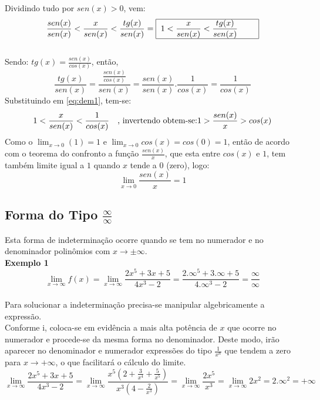 Dividindo tudo por $sen(x) > 0$, vem:\\
\begin{equation}
\label{eq:dem1}
\frac{sen(x)}{sen(x)} < \frac{x}{sen(x)} < \frac{tg(x)}{sen(x)} = \begin{tabular}{|p{4.0cm}|} \hline  $\displaystyle 1 < \frac{x}{sen(x)} < \frac{tg(x)}{sen(x)}$\\ \hline \end{tabular}
\end{equation}\\




Sendo: $\displaystyle tg(x) = \frac{sen(x)}{cos(x)}$, então, $$\displaystyle \frac{tg(x)}{sen(x)} = \frac{\frac{sen(x)}{cos(x)}}{sen(x)} = \frac{sen(x)}{sen(x)} . \frac{1}{cos(x)} = \frac{1}{cos(x)}$$ Substituindo em \ref{eq:dem1}, tem-se:
$$
1 < \frac{x}{sen(x)} < \frac{1}{cos(x)} \quad \textrm{, invertendo obtem-se:}\\
1 > \frac{sen(x)}{x} > cos(x)
$$
Como o $\displaystyle \lim_{x \to 0} (1) = 1$ e $\displaystyle \lim_{x \to 0} cos(x) = cos(0) = 1$, então de acordo com o teorema do confronto a função $\displaystyle \frac{sen(x)}{x}$, que esta entre $cos(x)$ e $1$, tem também limite igual a $1$ quando $x$ tende a $0$ (zero), logo:
$$
\lim_{x \to 0} \frac{sen(x)}{x} = 1
$$


\subsection{Forma do Tipo $\displaystyle \frac{\infty}{\infty}$}
Esta forma de indeterminação ocorre quando se tem no numerador e no denominador polinômios com $x \to \pm \infty$.\\


\textbf{Exemplo 1}$$\displaystyle \lim_{x \to \infty} f(x) = \lim_{x \to \infty} \frac{2x^5+3x+5}{4x^3 -2} = \frac{2 . \infty^5 + 3 . \infty + 5}{4 . \infty^3 -2} = \frac{\infty}{\infty}$$\\

Para solucionar a indeterminação precisa-se manipular algebricamente a expressão.\\

\quad Conforme i, coloca-se em evidência a mais alta potência de $x$ que ocorre no numerador e procede-se da mesma forma no denominador. Deste modo, irão aparecer no denominador e numerador expressões do tipo $\displaystyle \frac{1}{x^n}$ que tendem a zero para $x \to + \infty$, o que facilitará o cálculo do limite.
$$
\lim_{x \to \infty}  \frac{2x^5+3x+5}{4x^3 -2} =  \lim_{x \to \infty} \frac{x^5(2+\frac{3}{x^4} + \frac{5}{x^5})}{x^3(4-\frac{2}{x^3})} = \lim_{x \to \infty} \frac{2x^5}{x^3} = \lim_{x \to \infty} 2x^2 = 2. \infty^2 = + \infty
$$



